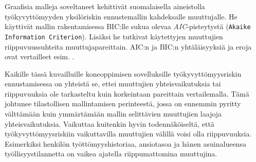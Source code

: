 Graafisia malleja soveltaneet \citet{airaksinen_development_2017} kehittivät suomalaisella aineistolla työkyvyttömyyden yksilöriskin ennustemallin kahdeksalle muuttujalle. He käyttivät mallin rakentamisessa BIC:lle sukua olevaa \emph{AIC}-pisteytystä (\texttt{Akaike Information Criterion}). Lisäksi he tutkivat käytettyjen muuttujien riippuvuussuhteita muuttujapareittain. AIC:n ja BIC:n yhtäläisyyksiä ja eroja ovat vertailleet esim. \citet{ding_model_2018}.

Kaikille tässä kuvailluille koneoppimisen sovelluksille työkyvyttömyysriskin ennustamisessa on yhteistä se, ettei muuttujien yhteisvaikutuksia tai riippuvuuksia ole tarkasteltu kuin korkeintaan pareittain vertailemalla. Tämä johtunee tilastollisen mallintamisen perinteestä, jossa on ennemmin pyritty välttämään kuin ymmärtämään mallin selittävien muuttujien laajoja yhteisvaikutuksia. Vaikuttaa kuitenkin hyvin todennäköiseltä, että työkyvyttömyysriskiin vaikuttavilla muuttujien välillä voisi olla riippuvuuksia. Esimerkiksi henkilön työttömyyshistoriaa, ansiotasoa ja hänen asuinalueensa työllisyystilannetta on vaikea ajatella riippumattomina muuttujina.



